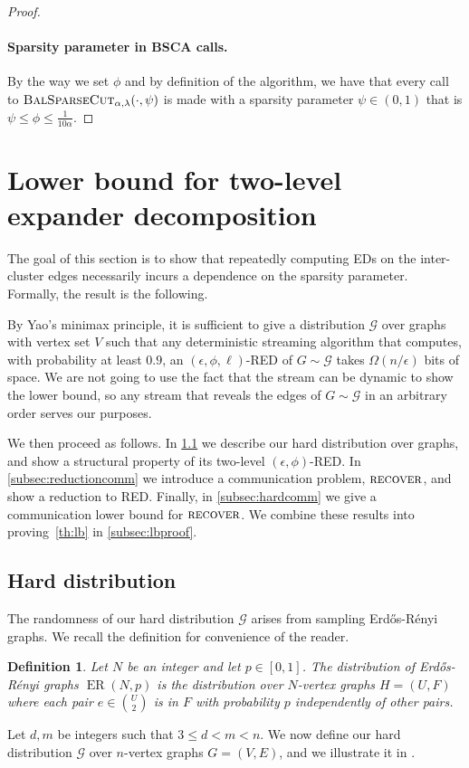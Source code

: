 \documentclass[epsfig,letter,11pt]{article}
\numberwithin{equation}{section}
\newcommand{\bsc}{\textsc{BalSparseCut}_{\alpha,\lambda}}
\DeclareMathOperator*{\er}{ER}
\DeclareMathOperator*{\recover}{\textsc{recover}}
\newtheorem{definition}[theorem]{Definition}
\begin{document}
\begin{proof}
	\paragraph{Sparsity parameter in BSCA calls.} By the way we set $\phi$ and by definition of the algorithm, we have that every call to $\bsc(\cdot, \psi)$ is made with a sparsity parameter $\psi \in (0,1)$ that is $\psi \le \phi \le \frac{1}{10\alpha}$.
	
\end{proof}
\section{Lower bound for two-level expander decomposition}
\label{sec:lb}
The goal of this section is to show that repeatedly computing EDs on the inter-cluster edges necessarily incurs a dependence on the sparsity parameter. Formally, the result is the following.

\lb*
\noindent
By Yao's minimax principle, it is sufficient to give a distribution $\mathcal{G}$ over graphs with vertex set $V$ such that any deterministic streaming algorithm that computes, with probability at least $0.9$, an $(\epsilon,\phi,\ell)$-RED of $G \sim \mathcal{G}$  takes $\Omega(n/\epsilon)$ bits of space. We are not going to use the fact that the stream can be dynamic to show the lower bound, so any stream that reveals the edges of $G \sim \mathcal{G}$  in an arbitrary order serves our purposes.

We then proceed as follows. In \cref{subsec:harddistrib} we describe our hard distribution over graphs, and show a structural property of its two-level $(\epsilon,\phi)$-RED. In \cref{subsec:reductioncomm} we introduce a communication problem, $\recover$, and show a reduction to RED. Finally, in \cref{subsec:hardcomm} we give a communication lower bound for $\recover$. We combine these results into proving~\cref{th:lb} in \cref{subsec:lbproof}.


\subsection{Hard distribution}
\label{subsec:harddistrib}
The randomness of our hard distribution $\mathcal{G}$ arises from sampling Erd\H{o}s-R\'{e}nyi graphs. We recall the definition for convenience of the reader.
\begin{definition}\label{def:er}
	Let $N$ be an integer and let $p \in [0,1]$. The distribution of Erd\H{o}s-R\'{e}nyi graphs $\er(N, p)$ is the distribution over $N$-vertex graphs $H=(U,F)$ where each pair $e \in \binom{U}{2}$ is in $F$ with probability $p$ independently of other pairs.
\end{definition}
\noindent
Let $d,m$ be integers such that $3 \le d < m < n$. We now define our hard distribution $\mathcal{G}$ over $n$-vertex  graphs $G=(V, E)$, and we illustrate it in .
\end{document}
